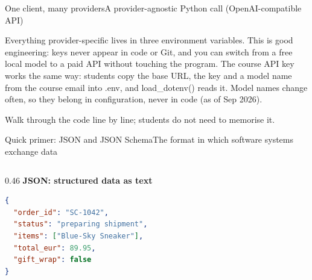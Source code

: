 \documentclass[aspectratio=169,11pt]{beamer}
\begin{document}
\begin{frame}[fragile]{One client, many providers}{A provider-agnostic Python call (OpenAI-compatible API)}
{  Everything provider-specific lives in three environment variables. This is good engineering: keys never appear in code or Git, and you can switch from a free local model to a paid API without touching the program. The course API key works the same way: students copy the base URL, the key and a model name from the course email into .env, and load\_dotenv() reads it. Model names change often, so they belong in configuration, never in code (as of Sep 2026).\par
  Walk through the code line by line; students do not need to memorise it.}
\end{frame}

\begin{frame}[fragile]{Quick primer: JSON and JSON Schema}{The format in which software systems exchange data}
  \begin{columns}[T]
    \begin{column}{0.46\textwidth}
      {\small\bfseries\color{cNavy}JSON: structured data as text}\par\vspace{2pt}
\begin{lstlisting}[language=JSON,showlines=true]
{
  "order_id": "SC-1042",
  "status": "preparing shipment",
  "items": ["Blue-Sky Sneaker"],
  "total_eur": 89.95,
  "gift_wrap": false
}


\end{lstlisting}
\end{column}
\end{columns}
\end{frame}
\end{document}
